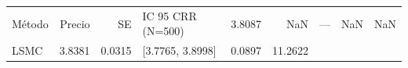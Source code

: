 \begin{tabular}{lrrlrr}
\toprule
Método & Precio & SE & IC 95 %
\midrule
CRR (N=500) & 3.8087 & NaN & — & NaN & NaN \\
LSMC & 3.8381 & 0.0315 & [3.7765, 3.8998] & 0.0897 & 11.2622 \\
\bottomrule
\end{tabular}
